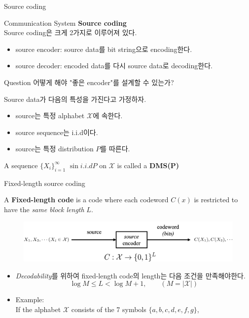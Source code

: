 \documentclass[9pt]{beamer}
\begin{document}
\begin{section}{Source coding}
        \begin{frame}{Communication System}
            \textbf{Source coding}
            \\ Source coding은 크게 2가지로 이루어져 있다. 
            \begin{itemize}
                \item source encoder: source data를 bit string으로 encoding한다.
                \item source decoder: encoded data를 다시 source data로 decoding한다.
            \end{itemize}
            \begin{alertblock}{Question}
                어떻게 해야 "좋은 encoder"를 설계할 수 있는가?
            \end{alertblock}
            \vspace{0.6cm}
            Source data가 다음의 특성을 가진다고 가정하자.
            \begin{itemize}
                \item source는 특정 alphabet $\mathcal X$에 속한다.
                \item source sequence는 i.i.d이다.
                \item source는 특정 distribution $P$를 따른다.
            \end{itemize}
            \begin{definition}
                A sequence $\{X_i\}_{i=1}^{\infty}$ $\sin i.i.d P$ on $\mathcal X$ is called a \textbf{DMS(P)}
            \end{definition}
        \end{frame}

        \begin{frame}{Fixed-length source coding}
            \begin{definition}
                A \textbf{Fixed-length code }is a code where each codeword $C(x)$ is restricted to have the \textit{same block length} $L$.
            \end{definition}
            \begin{figure}
                \includegraphics[width=0.8\columnwidth]{image/L3_fixed_length.png}
            \end{figure}
            \begin{itemize}
                \item \textit{Decodability}를 위하여 fixed-length code의 length는 다음 조건을 만족해야한다.
                $$\log M \le L < \log M+1,\qquad (M =|\mathcal X|)$$
                \item Example:
                \\ If the alphabet $\mathcal X$ consists of the 7 symbols $\{a, b, c, d, e, f, g\}$,
                \vspace{1cm}
            \end{itemize}
        \end{frame}


\end{section}
\end{document}
